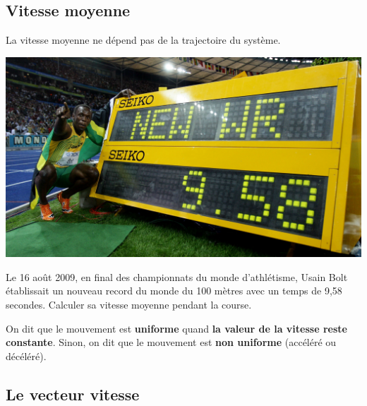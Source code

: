 \documentclass[12pt,a4paper]{article}
\begin{document}
\subsection{Vitesse moyenne}

\vfill\hfill
{}
\vfill

La vitesse moyenne ne dépend pas de la trajectoire du système.

\begin{multicols}{2}
\begin{center}
\includegraphics[width=\linewidth]{images/usain_bolt_wr.jpg}
\end{center}

\begin{em}
Le 16 août 2009, en final des championnats du monde d'athlétisme, Usain Bolt établissait un nouveau record du monde du 100 mètres avec un temps de 9{,}58 secondes.
Calculer sa vitesse moyenne pendant la course.
\end{em}
\end{multicols}

On dit que le mouvement est \textbf{uniforme} quand \textbf{la valeur de la vitesse reste constante}.
Sinon, on dit que le mouvement est \textbf{non uniforme} (accéléré ou décéléré).

\subsection{Le vecteur vitesse}
\end{document}
